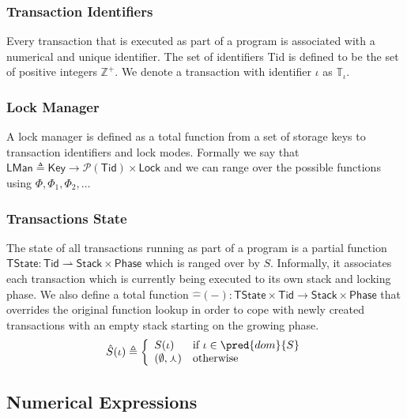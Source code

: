\subsubsection{Transaction Identifiers}

Every transaction that is executed as part of a program is associated with a numerical and unique identifier. The set of identifiers \textsf{Tid} is defined to be the set of positive integers $\mathds{Z}^+$. We denote a transaction with identifier $\iota$ as $\mathds{T}_\iota$.

\subsubsection{Lock Manager}

A lock manager is defined as a total function from a set of storage keys to transaction identifiers and lock modes. Formally we say that $\mathsf{LMan} \triangleq \mathsf{Key} \rightarrow \mathcal{P}(\mathsf{Tid}) \times \mathsf{Lock}$ and we can range over the possible functions using $\Phi, \Phi_1, \Phi_2, \ldots$

\subsubsection{Transactions State}

The state of all transactions running as part of a program is a partial function $\mathsf{TState} : \mathsf{Tid} \rightharpoonup \mathsf{Stack} \times \mathsf{Phase}$ which is ranged over by $S$. Informally, it associates each transaction which is currently being executed to its own stack and locking phase. We also define a total function $\hat{-}(-) : \mathsf{TState} \times \mathsf{Tid} \rightarrow \mathsf{Stack} \times \mathsf{Phase}$ that overrides the original function lookup in order to cope with newly created transactions with an empty stack starting on the growing phase.
\[
\hat{S}(\iota) \triangleq \bigg\{ \begin{array}{l l}
S(\iota) & \text{if } \iota \in \pred{dom}{S} \\
(\emptyset, \curlywedge) & \text{otherwise}
\end{array}
\]

\subsection{Numerical Expressions}

